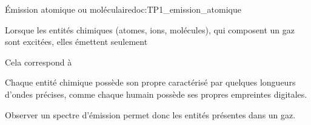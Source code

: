 \begin{doc}{Émission atomique ou moléculaire}{doc:TP1_emission_atomique}
  \begin{encart}
    Lorsque les entités chimiques (atomes, ions, molécules), qui composent un gaz sont excitées, elles émettent seulement 
    
    Cela correspond à 
  \end{encart}
    
  Chaque entité chimique possède son propre  caractérisé par quelques longueurs d'ondes précises, comme chaque humain possède ses propres empreintes digitales.

  Observer un spectre d'émission permet donc  les entités présentes dans un gaz.
\end{doc}